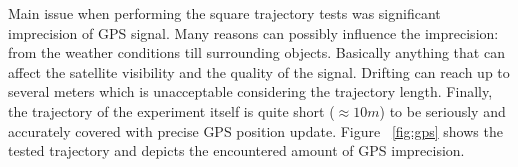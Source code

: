 Main issue when performing the square trajectory tests was significant imprecision of GPS signal. Many reasons can possibly influence the imprecision: from the weather conditions till surrounding objects. Basically anything that can affect the satellite visibility and the quality of the signal. Drifting can reach up to several meters which is unacceptable considering the trajectory length. Finally, the trajectory of the experiment itself is quite short ($ \approx 10 m $) to be seriously and accurately covered with precise GPS position update. Figure ~\ref{fig:gps} shows the tested trajectory and depicts the encountered amount of GPS imprecision.
\begin{figure}%
  \centering
\end{figure}

